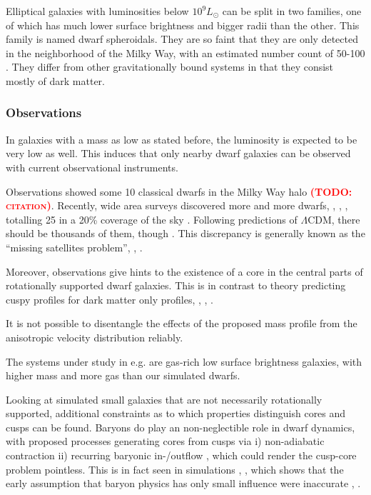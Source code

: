 \documentclass[useAMS,usenatbib]{mn2e}
\newcommand{\TODO}[1]{\textsc{\textbf{\textcolor{red}{(TODO: #1)}}}}
\begin{document}
Elliptical galaxies with luminosities below $10^9L_\odot$ can be split
in two families, one of which has much lower surface brightness and
bigger radii than the other. This family is named dwarf
spheroidals. They are so faint that they are only detected in
the neighborhood of the Milky Way, with an estimated number count of
50-100 \citep{Belokurov2007}. They differ from other gravitationally
bound systems in that they consist mostly of dark matter.

\subsubsection{Observations}
In galaxies with a mass as low as stated before, the luminosity is
expected to be very low as well. This induces that only nearby dwarf
galaxies can be observed with current observational instruments.

Observations showed some 10 classical dwarfs in the Milky Way halo
\TODO{citation}. Recently, wide area surveys discovered more and more
dwarfs, \citep{Belokurov2007}, \citep{Belokurov2009},
\citep{Belokurov2010}, totalling 25 in a 20\% coverage of the sky
\citep{Koposov2008}. Following predictions of $\Lambda$CDM, there
should be thousands of them, though \cite{Diemand2007}. This
discrepancy is generally known as the ``missing satellites problem'',
\citep{Moore1999}, \citep{Klypin1999}.

Moreover, observations give hints to the existence of a core in the
central parts of rotationally supported dwarf galaxies. This is in
contrast to theory predicting cuspy profiles for dark matter only
profiles, \citep{Moore1994}, \citep{Flores1994}, \citep{Moore1999a}.

It is not possible to disentangle the effects of the proposed mass
profile from the anisotropic velocity distribution reliably.

The systems under study in e.g. \cite{deBlok2001} are gas-rich low
surface brightness galaxies, with higher mass and more gas than our
simulated dwarfs.

Looking at simulated small galaxies that are not necessarily
rotationally supported, additional constraints as to which properties
distinguish cores and cusps can be found. Baryons do play an
non-neglectible role in dwarf dynamics, with proposed processes
generating cores from cusps via i) non-adiabatic contraction ii)
recurring baryonic in-/outflow \citep{Read2005}, which could render the
cusp-core problem pointless. This is in fact seen in simulations
\citep{Mashchenko2008}, \citep{Governato2009}, which shows that the
early assumption that baryon physics has only small influence were
inaccurate \citep{Navarro1996}, \citep{Gnedin2002}.
\end{document}
